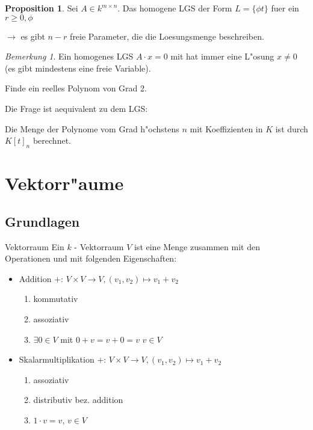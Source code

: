 \documentclass[oneside,fontsize=11pt,paper=a4,BCOR=0mm,DIV=12,automark,headsepline]{scrbook}
\theoremstyle{remark}
\theoremstyle{definition}
\newtheorem*{proposition}{Proposition}
\theoremstyle{definition}
\theoremstyle{remark}
\newtheorem*{bem}{Bemerkung}
\begin{document}
\begin{proposition}
Sei \(A\in k^{m\times n}\). Das homogene LGS der Form \(L=\{\phi
t \}\) fuer ein \(r\geq 0, \phi\)

\(\rightarrow\) es gibt \(n-r\) freie Parameter, die die Loesungsmenge beschreiben.
\end{proposition}

\begin{bem}
 Ein homogenes LGS \(A\cdot x=0\) mit  hat immer eine L"osung \(x\not=
0\) (es gibt mindestens eine freie Variable).
\end{bem}

\begin{exa} \label{}
Finde ein reelles Polynom von Grad 2.

Die Frage ist aequivalent zu dem LGS:
\end{exa}

\begin{definition}{}{}
Die Menge der Polynome vom Grad h"ochstens \(n\) mit Koeffizienten in \(K\) ist
durch \(K[t]_n\) berechnet.
\end{definition}

\part{Vektorr"aume}
\chapter{Grundlagen}
\label{sec:org4906e00}
\begin{definition}{Vektorraum}{}
Ein \(k\) - Vektorraum \(V\) ist eine Menge zusammen mit den Operationen und mit
folgenden Eigenschaften:
\begin{itemize}
\item Addition \(+:\, V\times V \to V, (v_1,v_2)\mapsto v_1+v_2\)
\begin{enumerate}
\item kommutativ
\item assoziativ
\item \(\exists 0 \in V\) mit \(0+v=v+0=v\) \(v \in V\)
\end{enumerate}
\item Skalarmultiplikation \(+:\, V\times V \to V, (v_1,v_2)\mapsto v_1+v_2\)
\begin{enumerate}
\item assoziativ
\item distributiv bez. addition
\item \(1\cdot v = v\), \(v\in V\)
\end{enumerate}
\end{itemize}
\end{definition}
\end{document}
